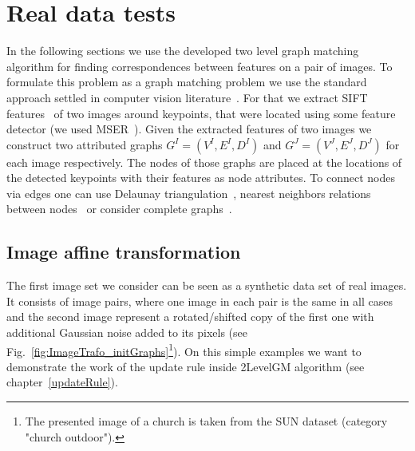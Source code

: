 \section{Real data tests}
In the following sections we use the developed two level graph matching algorithm for finding correspondences between features on a pair of images. To formulate this problem as a graph matching problem we use the standard approach settled in computer vision literature~\cite{Cho2010_RRWM,Cho2012_ProgressiveGM,FastPFP,Hancock_EM_SVD,Hancock_GM_SpectralPart}. For that we extract SIFT features~\cite{Lowe2004} of two images around keypoints, that were located using some feature detector (we used  MSER~\cite{MSER}). Given the extracted features of two images we construct two attributed graphs $G^I=(V^I,E^I,D^I)$ and $G^J=(V^J,E^J,D^J)$ for each image respectively. The nodes of those graphs are placed at the locations of the detected keypoints with their features as node attributes. To connect nodes via edges one can use Delaunay triangulation~\cite{Hancock_EM_SVD,Hancock_GM_SpectralPart}, nearest neighbors relations between nodes~\cite{Sanrom2012} or consider complete graphs~\cite{Cho2012_ProgressiveGM,Cho2014_Haystack}.

\subsection{Image affine transformation}
The first image set we consider can be seen as a synthetic data set of real images. It consists of image pairs, where one image in each pair is the same in all cases and the second image represent a rotated/shifted copy of the first one with additional Gaussian noise added to its pixels (see Fig.~\ref{fig:ImageTrafo_initGraphs}\footnote{The presented image of a church is taken from the SUN\cite{SUN} dataset (category "church outdoor").}). On this simple examples we want to demonstrate the work of the update rule inside 2LevelGM algorithm (see chapter~\ref{updateRule}).

